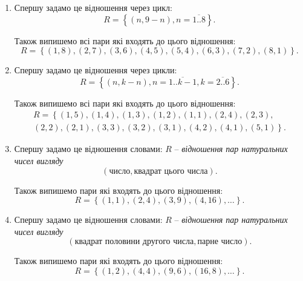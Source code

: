 \begin{solution}
	\nothing
	\begin{enumerate}
		\item Спершу задамо це відношення через цикл: \[R = \left\{ \left( n, 9 - n \right), n = \overline{1..8} \right\}.\] 

		Також випишемо всі пари які входять до цього відношення: \[ R = \left\{ \left( 1, 8 \right), \left( 2, 7 \right), \left( 3, 6 \right), \left( 4, 5 \right), \left( 5, 4 \right), \left( 6, 3 \right), \left( 7, 2 \right), \left( 8, 1 \right) \right\}. \]

		\item Спершу задамо це відношення через цикли: \[R = \left\{ \left( n, k - n \right), n = \overline{1..k-1}, k = \overline{2..6} \right\}.\]

		Також випишемо всі пари які входять до цього відношення: \begin{multline*} R = \left\{ \left( 1, 5 \right), \left( 1, 4 \right), \left( 1, 3 \right), \left( 1, 2 \right), \left( 1, 1 \right), \left( 2, 4 \right), \left( 2, 3 \right), \right. \\ \left. \left( 2, 2 \right), \left( 2, 1 \right), \left( 3, 3 \right), \left( 3, 2 \right), \left( 3, 1 \right), \left( 4, 2 \right), \left( 4, 1 \right), \left( 5, 1 \right) \right\}. \end{multline*}
		
		\item Спершу задамо це відношення словами: $R$ -- \emph{відношення пар натуральних чисел вигляду} \[ \left( \text{число}, \text{квадрат цього числа} \right). \]

		Також випишемо пари які входять до цього відношення: \[ R = \left\{ \left( 1, 1 \right), \left( 2, 4 \right), \left( 3, 9 \right), \left( 4, 16 \right), \ldots \right\}. \]
		
		\item Спершу задамо це відношення словами: $R$ -- \emph{відношення пар натуральних чисел вигляду} \[ \left( \text{квадрат половини другого числа}, \text{парне число} \right). \]

		Також випишемо пари які входять до цього відношення: \[ R = \left\{ \left( 1, 2 \right), \left( 4, 4 \right), \left(9 , 6 \right), \left(16 , 8 \right), \ldots \right\}. \]
		
	\end{enumerate}
\end{solution}

\newpage


